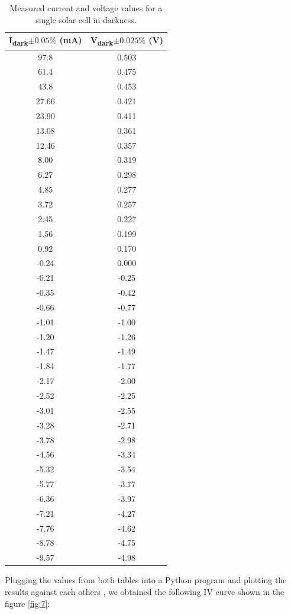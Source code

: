 \documentclass[12pt]{article}
\begin{document}
\begin{table}[H]
\centering
\begin{tabular}{|c|c|}
\hline
\textbf{I\textsubscript{dark}\(\pm0.05\%\) (mA)} & \textbf{V\textsubscript{dark}\(\pm0.025\%\) (V)} \\
\hline
97.8   & 0.503  \\
61.4   & 0.475  \\
43.8   & 0.453  \\
27.66  & 0.421  \\
23.90  & 0.411  \\
13.08  & 0.361  \\
12.46  & 0.357  \\
8.00   & 0.319  \\
6.27   & 0.298  \\
4.85   & 0.277  \\
3.72   & 0.257  \\
2.45   & 0.227  \\
1.56   & 0.199  \\
0.92   & 0.170  \\
-0.24  & 0.000  \\
-0.21  & -0.25  \\
-0.35  & -0.42  \\
-0.66  & -0.77  \\
-1.01  & -1.00  \\
-1.20  & -1.26  \\
-1.47  & -1.49  \\
-1.84  & -1.77  \\
-2.17  & -2.00  \\
-2.52  & -2.25  \\
-3.01  & -2.55  \\
-3.28  & -2.71  \\
-3.78  & -2.98  \\
-4.56  & -3.34  \\
-5.32  & -3.54  \\
-5.77  & -3.77  \\
-6.36  & -3.97  \\
-7.21  & -4.27  \\
-7.76  & -4.62  \\
-8.78  & -4.75  \\
-9.57  & -4.98  \\
\hline
\end{tabular}
\caption{Measured current and voltage values for a single solar cell in darkness.}
\label{tab:dark_measurements}
\end{table}
Plugging the values from both tables into a Python program and plotting the results against each others , we obtained the following IV curve shown in the figure  \ref{fig:7}:
\end{document}
